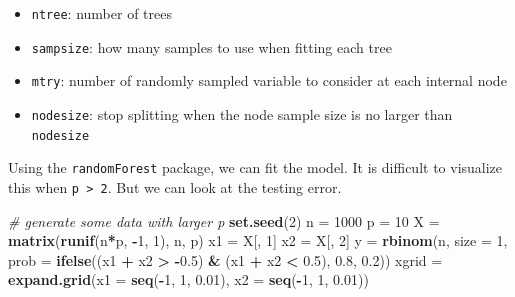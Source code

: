\documentclass[
]{book}
\newenvironment{Shaded}{\begin{snugshade}}{\end{snugshade}}
\newcommand{\AttributeTok}[1]{\textcolor[rgb]{0.13,0.29,0.53}{#1}}
\newcommand{\CommentTok}[1]{\textcolor[rgb]{0.56,0.35,0.01}{\textit{#1}}}
\newcommand{\DecValTok}[1]{\textcolor[rgb]{0.00,0.00,0.81}{#1}}
\newcommand{\FloatTok}[1]{\textcolor[rgb]{0.00,0.00,0.81}{#1}}
\newcommand{\FunctionTok}[1]{\textcolor[rgb]{0.13,0.29,0.53}{\textbf{#1}}}
\newcommand{\NormalTok}[1]{#1}
\newcommand{\OtherTok}[1]{\textcolor[rgb]{0.56,0.35,0.01}{#1}}
\newcommand{\SpecialCharTok}[1]{\textcolor[rgb]{0.81,0.36,0.00}{\textbf{#1}}}
\providecommand{\tightlist}{%
  \setlength{\itemsep}{0pt}\setlength{\parskip}{0pt}}
\theoremstyle{definition}
\theoremstyle{definition}
\theoremstyle{definition}
\theoremstyle{definition}
\theoremstyle{remark}
\begin{document}
\begin{itemize}
\tightlist
\item
  \texttt{ntree}: number of trees
\item
  \texttt{sampsize}: how many samples to use when fitting each tree
\item
  \texttt{mtry}: number of randomly sampled variable to consider at each internal node
\item
  \texttt{nodesize}: stop splitting when the node sample size is no larger than \texttt{nodesize}
\end{itemize}

Using the \texttt{randomForest} package, we can fit the model. It is difficult to visualize this when \texttt{p\ \textgreater{}\ 2}. But we can look at the testing error.

\begin{Shaded}
\begin{Highlighting}[]
  \CommentTok{\# generate some data with larger p}
  \FunctionTok{set.seed}\NormalTok{(}\DecValTok{2}\NormalTok{)}
\NormalTok{  n }\OtherTok{=} \DecValTok{1000}
\NormalTok{  p }\OtherTok{=} \DecValTok{10}
\NormalTok{  X }\OtherTok{=} \FunctionTok{matrix}\NormalTok{(}\FunctionTok{runif}\NormalTok{(n}\SpecialCharTok{*}\NormalTok{p, }\SpecialCharTok{{-}}\DecValTok{1}\NormalTok{, }\DecValTok{1}\NormalTok{), n, p)}
\NormalTok{  x1 }\OtherTok{=}\NormalTok{ X[, }\DecValTok{1}\NormalTok{]}
\NormalTok{  x2 }\OtherTok{=}\NormalTok{ X[, }\DecValTok{2}\NormalTok{]}
\NormalTok{  y }\OtherTok{=} \FunctionTok{rbinom}\NormalTok{(n, }\AttributeTok{size =} \DecValTok{1}\NormalTok{, }\AttributeTok{prob =} \FunctionTok{ifelse}\NormalTok{((x1 }\SpecialCharTok{+}\NormalTok{ x2 }\SpecialCharTok{\textgreater{}} \SpecialCharTok{{-}}\FloatTok{0.5}\NormalTok{) }\SpecialCharTok{\&}\NormalTok{ (x1 }\SpecialCharTok{+}\NormalTok{ x2 }\SpecialCharTok{\textless{}} \FloatTok{0.5}\NormalTok{), }\FloatTok{0.8}\NormalTok{, }\FloatTok{0.2}\NormalTok{))}
\NormalTok{  xgrid }\OtherTok{=} \FunctionTok{expand.grid}\NormalTok{(}\AttributeTok{x1 =} \FunctionTok{seq}\NormalTok{(}\SpecialCharTok{{-}}\DecValTok{1}\NormalTok{, }\DecValTok{1}\NormalTok{, }\FloatTok{0.01}\NormalTok{), }\AttributeTok{x2 =} \FunctionTok{seq}\NormalTok{(}\SpecialCharTok{{-}}\DecValTok{1}\NormalTok{, }\DecValTok{1}\NormalTok{, }\FloatTok{0.01}\NormalTok{))}


\end{Highlighting}
\end{Shaded}
\end{document}
